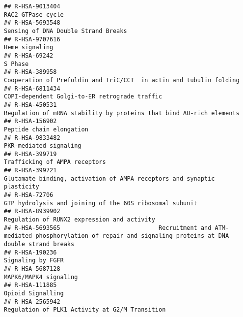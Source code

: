 \documentclass[
]{article}
\begin{document}
\begin{verbatim}
## R-HSA-9013404                                                                                                                    RAC2 GTPase cycle
## R-HSA-5693548                                                                                                  Sensing of DNA Double Strand Breaks
## R-HSA-9707616                                                                                                                       Heme signaling
## R-HSA-69242                                                                                                                                S Phase
## R-HSA-389958                                                                   Cooperation of Prefoldin and TriC/CCT  in actin and tubulin folding
## R-HSA-6811434                                                                                        COPI-dependent Golgi-to-ER retrograde traffic
## R-HSA-450531                                                                   Regulation of mRNA stability by proteins that bind AU-rich elements
## R-HSA-156902                                                                                                              Peptide chain elongation
## R-HSA-9833482                                                                                                               PKR-mediated signaling
## R-HSA-399719                                                                                                         Trafficking of AMPA receptors
## R-HSA-399721                                                               Glutamate binding, activation of AMPA receptors and synaptic plasticity
## R-HSA-72706                                                                                GTP hydrolysis and joining of the 60S ribosomal subunit
## R-HSA-8939902                                                                                          Regulation of RUNX2 expression and activity
## R-HSA-5693565                            Recruitment and ATM-mediated phosphorylation of repair and signaling proteins at DNA double strand breaks
## R-HSA-190236                                                                                                                     Signaling by FGFR
## R-HSA-5687128                                                                                                                MAPK6/MAPK4 signaling
## R-HSA-111885                                                                                                                     Opioid Signalling
## R-HSA-2565942                                                                                       Regulation of PLK1 Activity at G2/M Transition

\end{verbatim}
\end{document}
